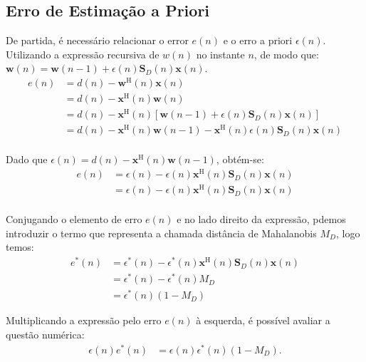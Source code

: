 \subsection{Erro de Estimação a Priori} %

De partida, é necessário relacionar o error $e(n)$ e o erro a priori $\epsilon(n)$. Utilizando a expressão recursiva de $w(n)$ no instante $n$, de modo que: $\mathbf{w}(n) = \mathbf{w}(n-1) + \epsilon(n) \mathbf{S}_{D}(n) \mathbf{x}(n)$.
\begin{align*}
    e(n) &= d(n) - \mathbf{w}^{\text{H}}(n) \mathbf{x}(n) \\
    &= d(n) - \mathbf{x}^{\text{H}}(n) \mathbf{w}(n) \\
    &= d(n) - \mathbf{x}^{\text{H}}(n) \left[\mathbf{w}(n-1) + \epsilon(n) \mathbf{S}_{D}(n) \mathbf{x}(n)\right] \\
    &= d(n) - \mathbf{x}^{\text{H}}(n) \mathbf{w}(n-1) - \mathbf{x}^{\text{H}}(n) \epsilon(n) \mathbf{S}_{D}(n) \mathbf{x}(n) \\
\end{align*}

Dado que $\epsilon(n) = d(n) - \mathbf{x}^{\text{H}}(n) \mathbf{w}(n-1)$, obtém-se:
\begin{align*}
    e(n) &= \epsilon(n) - \epsilon(n) \mathbf{x}^{\text{H}}(n) \mathbf{S}_{D}(n) \mathbf{x}(n) \\
    &= \epsilon(n) - \epsilon(n) \mathbf{x}^{\text{H}}(n) \mathbf{S}_{D}(n) \mathbf{x}(n) \\
\end{align*}

Conjugando o elemento de erro $e(n)$ e no lado direito da expressão, pdemos introduzir o termo que representa a chamada distância de Mahalanobis $M_D$, logo temos:
\begin{align*}
    e^{*}(n) &= \epsilon^{*}(n) - \epsilon^{*}(n) \mathbf{x}^{\text{H}}(n) \mathbf{S}_{D}(n) \mathbf{x}(n) \\
    &= \epsilon^{*}(n) - \epsilon^{*}(n) M_D \\
    &= \epsilon^{*}(n) (1 - M_D)
\end{align*}

Multiplicando a expressão pelo erro $e(n)$ à esquerda, é possível avaliar a questão numérica:
\begin{align*}
    \epsilon(n) e^{*}(n) &= \epsilon(n) \epsilon^{*}(n) \left(1 - M_D \right).
\end{align*}


